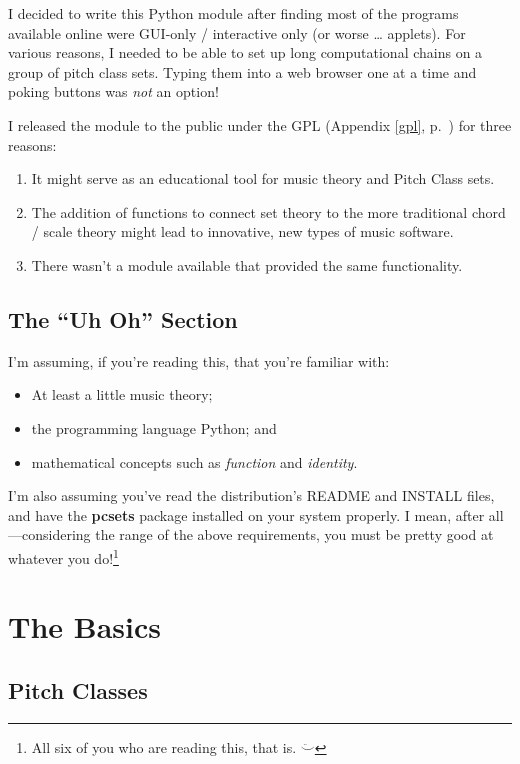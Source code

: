 \documentclass[letterpaper,12pt,oneside]{book}
\begin{document}
I decided to write this Python module after finding most of the
programs available online were GUI-only / interactive only (or worse
\ldots{} applets). For various reasons, I needed to be able to set up
long computational chains on a group of pitch class sets. Typing them
into a web browser one at a time and poking buttons was {\em not} an
option!

I released the module to the public under the GPL (Appendix \ref{gpl},
p.~\pageref{gpl}) for three reasons:

\begin{enumerate}
\item It might serve as an educational tool for music theory and
Pitch Class sets.
\item The addition of functions to connect set theory to the more
traditional chord / scale theory might lead to innovative, new
types of music software.
\item There wasn't a module available that provided the same
functionality.
\end{enumerate}


\section{The ``Uh Oh'' Section}

I'm assuming, if you're reading this, that you're familiar with:

\begin{itemize}
\item At least a little music theory;
\item the programming language Python; and
\item mathematical concepts such as {\em function} and {\em identity}.
\end{itemize}

I'm also assuming you've read the distribution's README and INSTALL
files, and have the {\bf pcsets} package installed on your system
properly. I mean, after all---considering the range of the above
requirements, you must be pretty good at whatever you do!\footnote{
All six of you who are reading this, that is. $\ddot\smile$ }



\chapter{The Basics}

\section{Pitch Classes}
\end{document}
